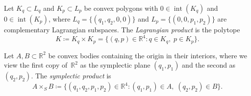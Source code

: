 
\begin{unverified}
\begin{definition}\label{def:lagrangian-product}
Let $K_q \subset L_q$ and $K_p \subset L_p$ be convex polygons
with $0 \in \operatorname{int}(K_q)$ and $0 \in \operatorname{int}(K_p)$,
where $L_q = \{(q_1, q_2, 0, 0)\}$ and $L_p = \{(0, 0, p_1, p_2)\}$
are complementary Lagrangian subspaces.
The \emph{Lagrangian product} is the polytope
\[
  K \coloneqq K_q \times K_p
  = \{ (q, p) \in \mathbb{R}^4 : q \in K_q,\; p \in K_p \}.
\]
\end{definition}
\end{unverified}


\begin{unverified}
\begin{definition}\label{def:symplectic-product}
Let $A, B \subset \mathbb{R}^2$ be convex bodies containing
the origin in their interiors, where we view the first copy
of~$\mathbb{R}^2$ as the symplectic plane $(q_1, p_1)$ and
the second as $(q_2, p_2)$.
The \emph{symplectic product} is
\[
  A \times_S B
    \coloneqq \{(q_1, q_2, p_1, p_2) \in \mathbb{R}^4
      : (q_1, p_1) \in A,\; (q_2, p_2) \in B\}.
\]
\end{definition}
\end{unverified}


